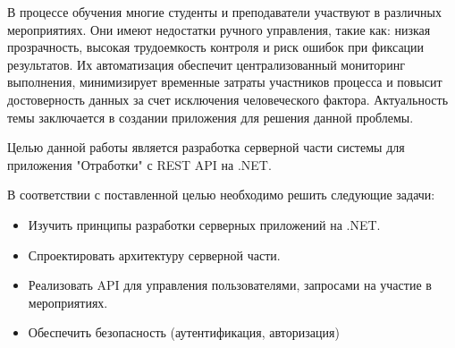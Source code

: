 \intro

В процессе обучения многие студенты и преподаватели участвуют в различных мероприятиях. Они имеют недостатки ручного управления, такие как: низкая прозрачность, высокая трудоемкость контроля и риск ошибок при фиксации результатов. Их автоматизация обеспечит централизованный мониторинг выполнения, минимизирует временные затраты участников процесса и повысит достоверность данных за счет исключения человеческого фактора. Актуальность темы заключается в создании приложения для решения данной проблемы.

Целью данной работы является разработка серверной части системы для приложения "Отработки" с REST API на .NET.

В соответствии с поставленной целью необходимо решить следующие задачи:
\begin{itemize}
	\item{Изучить принципы разработки серверных приложений на .NET.}
	\item{Спроектировать архитектуру серверной части.}
	\item{Реализовать API для управления пользователями, запросами на участие в мероприятиях.}
	\item{Обеспечить безопасность (аутентификация, авторизация)}
\end{itemize}

